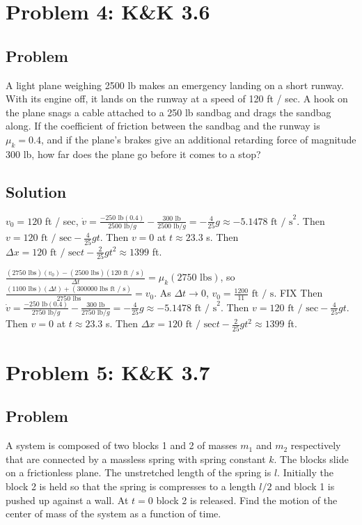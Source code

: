\documentclass[solutions]{esg8012pset}
\begin{document}
\section*{Problem 4: K\&K 3.6}
\subsection*{Problem}
  A light plane weighing 2500 lb makes an emergency landing on a short runway. With its engine off, it lands on the runway at a speed of 120 ft / sec. A hook on the plane snags a cable attached to a 250 lb sandbag and drags the sandbag along. If the coefficient of friction between the sandbag and the runway is $\mu_k = 0.4$, and if the plane's brakes give an additional retarding force of magnitude 300 lb, how far does the plane go before it comes to a stop?
\subsection*{Solution}
  $v_0 = 120$ ft / sec, $\dot v = \frac{-250\text{ lb}(0.4)}{2500\text{ lb} / g} - \frac{300\text{ lb}}{2500\text{ lb} / g} = -\frac{4}{25} g \approx -5.1478\text{ ft / s}^2$.  Then $v = 120\text{ ft / sec} -\frac{4}{25} g t$.  Then $v = 0$ at $t \approx 23.3$ s.  Then $\Delta x = 120\text{ ft / sec} t - \frac{2}{25} g t^2 \approx 1399$ ft.


   $\frac{(2750\text{ lbs})(v_0) - (2500\text{ lbs})(120\text{ ft / s})}{\Delta t} = \mu_k (2750\text{ lbs})$, so $\frac{(1100\text{ lbs})(\Delta t) + (300000\text{ lbs ft / s})}{2750\text{ lbs}} = v_0$.  As $\Delta t \longrightarrow 0$, $v_0 = \frac{1200}{11}\text{ ft / s}$.  FIX Then $\dot v = \frac{-250\text{ lb}(0.4)}{2750\text{ lb} / g} - \frac{300\text{ lb}}{2750\text{ lb} / g} = -\frac{4}{25} g \approx -5.1478\text{ ft / s}^2$.  Then $v = 120\text{ ft / sec} -\frac{4}{25} g t$.  Then $v = 0$ at $t \approx 23.3$ s.  Then $\Delta x = 120\text{ ft / sec} t - \frac{2}{25} g t^2 \approx 1399$ ft.
\section*{Problem 5: K\&K 3.7}
\subsection*{Problem}
  A system is composed of two blocks 1 and 2 of masses $m_1$ and $m_2$ respectively that are connected by a massless spring with spring constant $k$. The blocks slide on a frictionless plane. The unstretched length of the spring is $l$. Initially the block 2 is held so that the spring is compresses to a length $l / 2$ and block 1 is pushed up against a wall. At $t = 0$ block 2 is released. Find the motion of the center of mass of the system as a function of time.
\end{document}
